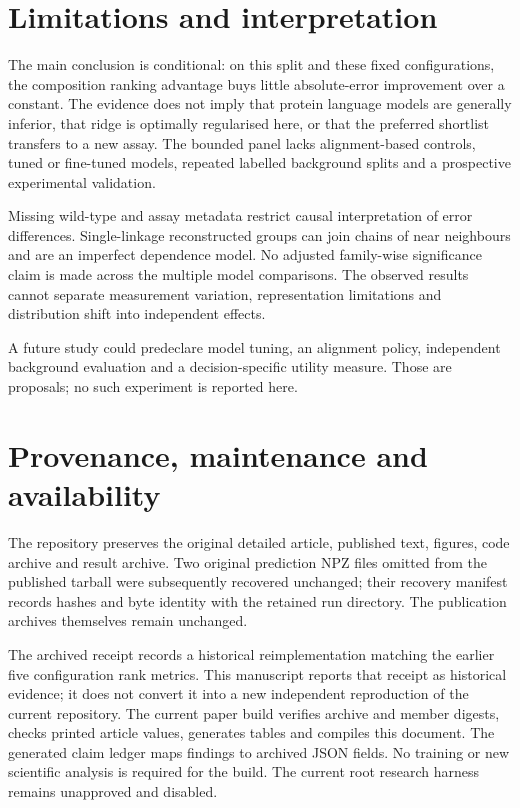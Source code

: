 \documentclass[11pt]{article}
\begin{document}
\section{Limitations and interpretation}
The main conclusion is conditional: on this split and these fixed configurations, the
composition ranking advantage buys little absolute-error improvement over a constant.
The evidence does not imply that protein language models are generally inferior, that
ridge is optimally regularised here, or that the preferred shortlist transfers to a new
assay. The bounded panel lacks alignment-based controls, tuned or fine-tuned models,
repeated labelled background splits and a prospective experimental validation.

Missing wild-type and assay metadata restrict causal interpretation of error differences.
Single-linkage reconstructed groups can join chains of near neighbours and are an
imperfect dependence model. No adjusted family-wise significance claim is made across
the multiple model comparisons. The observed results cannot separate measurement
variation, representation limitations and distribution shift into independent effects.

A future study could predeclare model tuning, an alignment policy, independent
background evaluation and a decision-specific utility measure. Those are proposals;
no such experiment is reported here.

\section{Provenance, maintenance and availability}
The repository preserves the original detailed article, published text, figures,
code archive and result archive. Two original prediction NPZ files omitted from the
published tarball were subsequently recovered unchanged; their recovery manifest
records hashes and byte identity with the retained run directory. The publication
archives themselves remain unchanged.

The archived receipt records a historical reimplementation matching the earlier five
configuration rank metrics. This manuscript reports that receipt as historical evidence;
it does not convert it into a new independent reproduction of the current repository.
The current paper build verifies archive and member digests, checks printed article
values, generates tables and compiles this document. The generated claim ledger maps
findings to archived JSON fields. No training or new scientific analysis is required
for the build. The current root research harness remains unapproved and disabled.
\end{document}
